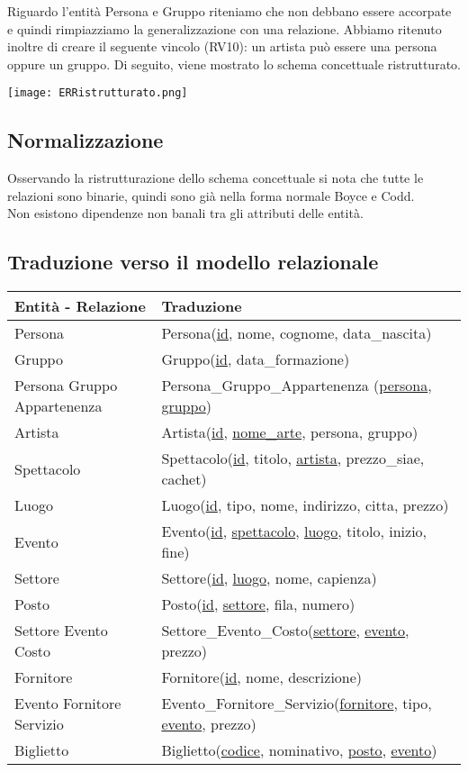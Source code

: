 \documentclass[a4paper,11pt]{article}
\begin{document}
Riguardo l'entità Persona e Gruppo riteniamo che non debbano essere accorpate e quindi rimpiazziamo la generalizzazione con una relazione.
Abbiamo ritenuto inoltre di creare il seguente vincolo (RV10): un artista può essere una persona oppure un gruppo.
Di seguito, viene mostrato lo schema concettuale ristrutturato.

\texttt{[image: ERRistrutturato.png]}

\subsection{Normalizzazione}

Osservando la ristrutturazione dello schema concettuale si nota che tutte le relazioni sono binarie, quindi sono già nella forma normale Boyce e Codd.\\
Non esistono dipendenze non banali tra gli attributi delle entità.

\subsection{Traduzione verso il modello relazionale}
\begin{tabularx}{\textwidth}{|X|>{\raggedright\arraybackslash}X|}
\hline
  \textbf{Entità - Relazione} & \textbf{Traduzione}\\
\hline
  Persona & Persona(\underline{id}, nome, cognome, data\_nascita) \\
\hline
  Gruppo & Gruppo(\underline{id}, data\_formazione) \\
\hline
  Persona Gruppo Appartenenza & Persona\_Gruppo\_Appartenenza (\underline{persona}, \underline{gruppo}) \\
\hline
  Artista & Artista(\underline{id}, \underline{nome\_arte}, persona, gruppo) \\
\hline
  Spettacolo & Spettacolo(\underline{id}, titolo, \underline{artista}, prezzo\_siae, cachet) \\
\hline
  Luogo & Luogo(\underline{id}, tipo, nome, indirizzo, citta, prezzo) \\
\hline
  Evento & Evento(\underline{id}, \underline{spettacolo}, \underline{luogo}, titolo, inizio, fine) \\
\hline
  Settore & Settore(\underline{id}, \underline{luogo}, nome, capienza) \\
\hline
  Posto & Posto(\underline{id}, \underline{settore}, fila, numero) \\
\hline
  Settore Evento Costo & Settore\_Evento\_Costo(\underline{settore}, \underline{evento}, prezzo) \\
\hline
  Fornitore & Fornitore(\underline{id}, nome, descrizione) \\
\hline
  Evento Fornitore Servizio & Evento\_Fornitore\_Servizio(\underline{fornitore}, tipo, \underline{evento}, prezzo) \\
\hline
  Biglietto & Biglietto(\underline{codice}, nominativo, \underline{posto}, \underline{evento}) \\
\hline
\end{tabularx}
\end{document}

